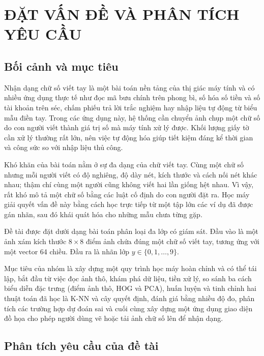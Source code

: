 \documentclass[a4paper,oneside]{report}
\begin{document}
\setcounter{page}{1}

\chapter{ĐẶT VẤN ĐỀ VÀ PHÂN TÍCH YÊU CẦU}

\section{Bối cảnh và mục tiêu}

Nhận dạng chữ số viết tay là một bài toán nền tảng của thị giác máy tính và có nhiều ứng dụng thực tế như đọc mã
bưu chính trên phong bì, số hóa số tiền và số tài khoản trên séc, chấm phiếu trả lời trắc nghiệm hay nhập liệu
tự động từ biểu mẫu điền tay. Trong các ứng dụng này, hệ thống cần chuyển ảnh chụp một chữ số do con người viết
thành giá trị số mà máy tính xử lý được. Khối lượng giấy tờ cần xử lý thường rất lớn, nên việc tự động hóa giúp
tiết kiệm đáng kể thời gian và công sức so với nhập liệu thủ công.

Khó khăn của bài toán nằm ở sự đa dạng của chữ viết tay. Cùng một chữ số nhưng mỗi người viết có độ nghiêng, độ
dày nét, kích thước và cách nối nét khác nhau; thậm chí cùng một người cũng không viết hai lần giống hệt nhau. Vì
vậy, rất khó mô tả một chữ số bằng các luật cố định do con người đặt ra. Học máy giải quyết vấn đề này bằng cách
học trực tiếp từ một tập lớn các ví dụ đã được gán nhãn, sau đó khái quát hóa cho những mẫu chưa từng gặp.

Đề tài được đặt dưới dạng bài toán phân loại đa lớp có giám sát. Đầu vào là một ảnh xám kích thước
$8 \times 8$ điểm ảnh chứa đúng một chữ số viết tay, tương ứng với một vector 64 chiều. Đầu ra là nhãn lớp
$y \in \{0, 1, \dots, 9\}$.

Mục tiêu của nhóm là xây dựng một quy trình học máy hoàn chỉnh và có thể tái lập, bắt đầu từ việc đọc ảnh thô,
khám phá dữ liệu, tiền xử lý, so sánh ba cách biểu diễn đặc trưng (điểm ảnh thô, HOG và PCA), huấn luyện và tinh
chỉnh hai thuật toán đã học là K-NN và cây quyết định, đánh giá bằng nhiều độ đo, phân tích các trường hợp dự
đoán sai và cuối cùng xây dựng một ứng dụng giao diện đồ họa cho phép người dùng vẽ hoặc tải ảnh chữ số lên để
nhận dạng.

\section{Phân tích yêu cầu của đề tài}
\end{document}
